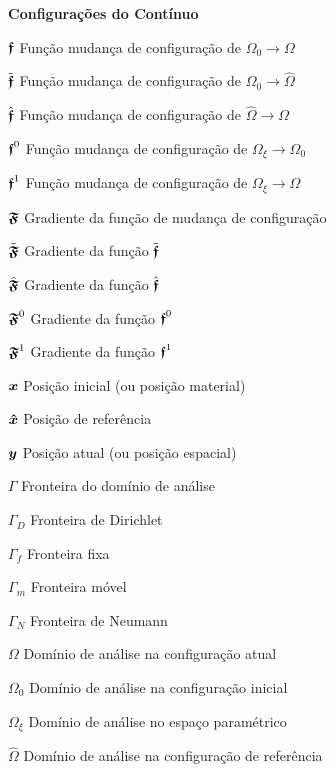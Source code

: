 \begin{simbolos}
  \item[\textbf{Configurações do Contínuo}]
  \item[$\boldsymbol{\mathfrak{f}}$] Função mudança de configuração de $\Omega_0\to\Omega$
  \item[$\tilde{\boldsymbol{\mathfrak{f}}}$] Função mudança de configuração de $\Omega_0\to\hat{\Omega}$
  \item[$\hat{\boldsymbol{\mathfrak{f}}}$] Função mudança de configuração de $\hat{\Omega}\to\Omega$
  \item[$\boldsymbol{\mathfrak{f}}^0$] Função mudança de configuração de $\Omega_\xi\to\Omega_0$
  \item[$\boldsymbol{\mathfrak{f}}^1$] Função mudança de configuração de $\Omega_\xi\to\Omega$
  \item[$\boldsymbol{\mathfrak{F}}$] Gradiente da função de mudança de configuração
  \item[$\tilde{\boldsymbol{\mathfrak{F}}}$] Gradiente da função $\tilde{\boldsymbol{\mathfrak{f}}}$
  \item[$\hat{\boldsymbol{\mathfrak{F}}}$] Gradiente da função $\hat{\boldsymbol{\mathfrak{f}}}$
  \item[$\boldsymbol{\mathfrak{F}}^0$] Gradiente da função $\boldsymbol{\mathfrak{f}}^0$
  \item[$\boldsymbol{\mathfrak{F}}^1$] Gradiente da função $\boldsymbol{\mathfrak{f}}^1$
  \item[$\boldsymbol{x}$] Posição inicial (ou posição material)
  \item[$\boldsymbol{\hat{x}}$] Posição de referência
  \item[$\boldsymbol{y}$] Posição atual (ou posição espacial)
  \item[$\Gamma$] Fronteira do domínio de análise
  \item[$\Gamma_D$] Fronteira de Dirichlet
  \item[$\Gamma_f$] Fronteira fixa
  \item[$\Gamma_m$] Fronteira móvel
  \item[$\Gamma_N$] Fronteira de Neumann
  \item[$\Omega$] Domínio de análise na configuração atual
  \item[$\Omega_0$] Domínio de análise na configuração inicial
  \item[$\Omega_\xi$] Domínio de análise no espaço paramétrico
  \item[$\hat{\Omega}$] Domínio de análise na configuração de referência


\end{simbolos}
